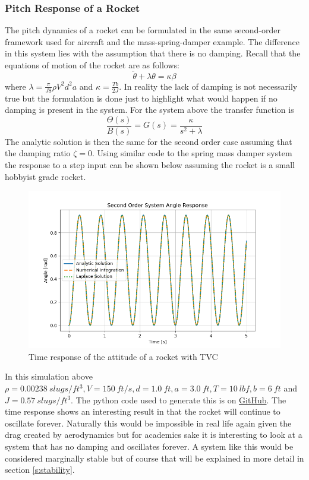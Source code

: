 \subsubsection{Pitch Response of a Rocket}\label{s:rocket_response}

The pitch dynamics of a rocket can be formulated in the same second-order framework used for aircraft and the mass-spring-damper example. The difference in this system lies with the assumption that there is no damping. Recall that the equations of motion of the rocket are as follows:
\begin{equation}
    \ddot{\theta} + \lambda \theta = \kappa \beta
\end{equation}
where $\lambda=\frac{\pi}{J8}\rho V^2 d^2 a$ and $\kappa=\frac{Tb}{2J}$. In reality the lack of damping is not necessarily true but the formulation is done just to highlight what would happen if no damping is present in the system. For the system above the transfer function is
\begin{equation}
  \frac{\Theta(s)}{B(s)} = G(s) = \frac{\kappa}{s^2+\lambda}
\end{equation}
The analytic solution is then the same for the second order case assuming that the damping ratio $\zeta=0$. Using similar code to the spring mass damper system the response to a step input can be shown below assuming the rocket is a small hobbyist grade rocket. 
\begin{figure}[H]
\centering
\includegraphics[width=0.8\linewidth]{Figures/rocket_response.png}
\caption{Time response of the attitude of a rocket with TVC}
\label{f:rocket_response}
\end{figure}
\noindent In this simulation above $\rho=0.00238~slugs/ft^3,V=150~ft/s,d=1.0~ft,a=3.0~ft,T=10~lbf,b=6~ft$ and $J=0.57~slugs/ft^3$. The python code used to generate this is on \href{https://github.com/cmontalvo251/Python/blob/master/controls/rocket.py}{GitHub}. The time response shows an interesting result in that the rocket will continue to oscillate forever. Naturally this would be impossible in real life again given the drag created by aerodynamics but for academics sake it is interesting to look at a system that has no damping and oscillates forever. A system like this would be considered marginally stable but of course that will be explained in more detail in section \ref{s:stability}.

